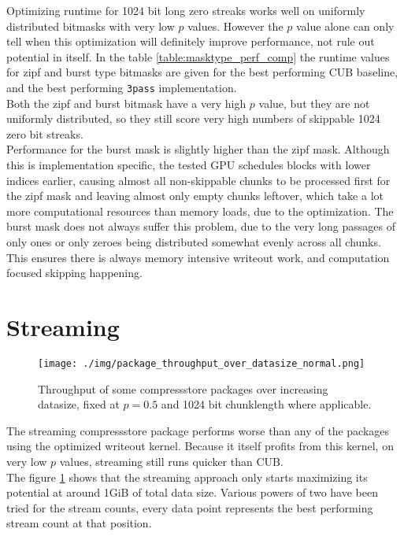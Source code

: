 \documentclass{tudscrreprt}
\begin{document}
			Optimizing runtime for 1024 bit long zero streaks works well on uniformly distributed bitmasks with very low $p$ values. However the $p$ value alone can only tell when this optimization will definitely improve performance, not rule out potential in itself. In the table \ref{table:masktype_perf_comp} the runtime values for zipf and burst type bitmasks are given for the best performing CUB baseline, and the best performing \texttt{3pass} implementation. \\
			Both the zipf and burst bitmask have a very high $p$ value, but they are not uniformly distributed, so they still score very high numbers of skippable 1024 zero bit streaks. \\
			Performance for the burst mask is slightly higher than the zipf mask. Although this is implementation specific, the tested GPU schedules blocks with lower indices earlier, causing almost all non-skippable chunks to be processed first for the zipf mask and leaving almost only empty chunks leftover, which take a lot more computational resources than memory loads, due to the optimization. The burst mask does not always suffer this problem, due to the very long passages of only ones or only zeroes being distributed somewhat evenly across all chunks. This ensures there is always memory intensive writeout work, and computation focused skipping happening. \\
		
		\section{Streaming}
			\begin{figure}[!ht]
				\centering
				\texttt{[image: ./img/package\_throughput\_over\_datasize\_normal.png]}
				\caption{\label{fig:package_throughput_over_datasize_normal}Throughput of some compressstore packages over increasing datasize, fixed at $p=0.5$ and 1024 bit chunklength where applicable.}
			\end{figure}
			
			The streaming compressstore package performs worse than any of the packages using the optimized writeout kernel. Because it itself profits from this kernel, on very low $p$ values, streaming still runs quicker than CUB. \\
			The figure \ref{fig:package_throughput_over_datasize_normal} shows that the streaming approach only starts maximizing its potential at around 1GiB of total data size. Various powers of two have been tried for the stream counts, every data point represents the best performing stream count at that position. \\
			
\end{document}
